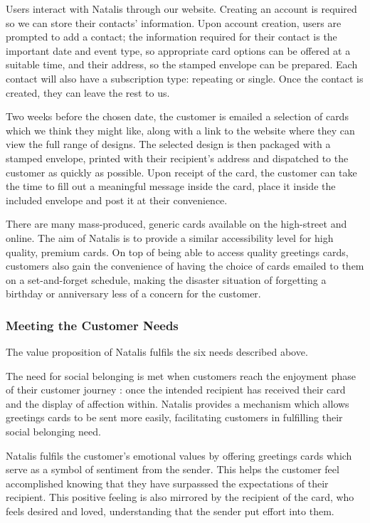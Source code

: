 \documentclass[10pt, a4paper]{article}
\begin{document}
Users interact with Natalis through our website. Creating an account is required so we can store their contacts' information. Upon account creation, users are prompted to add a contact; the information required for their contact is the important date and event type, so appropriate card options can be offered at a suitable time, and their address, so the stamped envelope can be prepared. Each contact will also have a subscription type: repeating or single. Once the contact is created, they can leave the rest to us.

Two weeks before the chosen date, the customer is emailed a selection of cards which we think they might like, along with a link to the website where they can view the full range of designs. The selected design is then packaged with a stamped envelope, printed with their recipient's address and dispatched to the customer as quickly as possible. Upon receipt of the card, the customer can take the time to fill out a meaningful message inside the card, place it inside the included envelope and post it at their convenience.

There are many mass-produced, generic cards available on the high-street and online. The aim of Natalis is to provide a similar accessibility level for high quality, premium cards. On top of being able to access quality greetings cards, customers also gain the convenience of having the choice of cards emailed to them on a set-and-forget schedule, making the disaster situation of forgetting a birthday or anniversary less of a concern for the customer.

\subsubsection*{Meeting the Customer Needs}
The value proposition of Natalis fulfils the six needs described above.

The need for social belonging is met when customers reach the enjoyment phase of their customer journey \citep{edelman2015competing}: once the intended recipient has received their card and the display of affection within. Natalis provides a mechanism which allows greetings cards to be sent more easily, facilitating customers in fulfilling their social belonging need.


Natalis fulfils the customer’s emotional values by offering greetings cards which serve as a symbol of sentiment from the sender. This helps the customer feel accomplished knowing that they have surpasssed the expectations of their recipient. This positive feeling is also mirrored by the recipient of the card, who feels desired and loved, understanding that the sender put effort into them.
\end{document}
